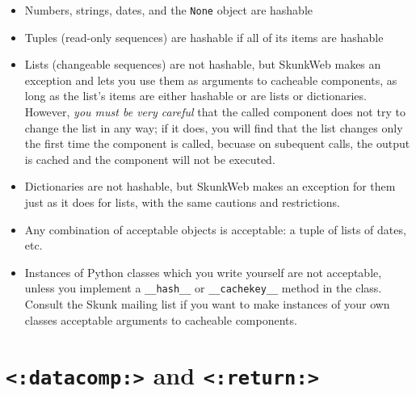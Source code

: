 \documentclass{manual}
\begin{document}
\begin{itemize}
\item Numbers, strings, dates, and the \texttt{None} object are hashable
\item Tuples (read-only sequences) are hashable if all of its items are hashable
\item Lists (changeable sequences) are not hashable, but SkunkWeb makes
an exception and lets you use them as arguments to cacheable 
components, as long as the list's items are either hashable or
are lists or dictionaries. However, \emph{you must be very careful} that the called
component does not try to change the list in any way; if it does,
you will find that the list changes only the first time the component
is called, becuase on subequent calls, the output is cached and the 
component will not be executed.

\item Dictionaries are not hashable, but SkunkWeb makes an exception for them
just as it does for lists, with the same cautions and restrictions.

\item Any combination of acceptable objects is acceptable: 
a tuple of lists of dates, etc.

\item Instances of Python classes which you write yourself are not
acceptable, unless you implement a \texttt{__hash__} or \texttt{__cachekey__}
method in the class. Consult the Skunk mailing list if you want
to make instances of your own classes acceptable arguments to 
cacheable components.

\end{itemize}





\section{\texttt{<:datacomp:>} and \texttt{<:return:>}}
\label{tagdatacomp}
\end{document}
